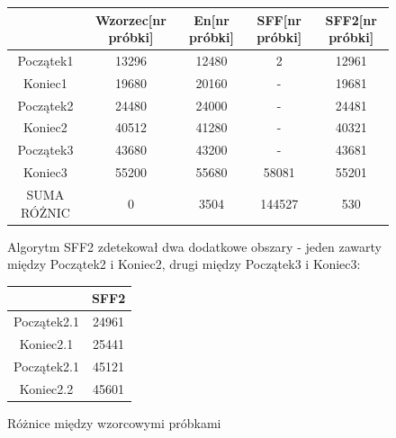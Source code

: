 \documentclass[eng,printmode]{mgr}
\begin{document}
	 \begin{figure}
	 	\begin{center}
	 		\begin{tabular}{||c c c c c||} 
	 			\hline
	 			&Wzorzec[nr próbki] & En[nr próbki] & SFF[nr próbki] & SFF2[nr próbki] \\ [0.5ex] 
	 			\hline
	 			Początek1 & 13296 & 12480 & 2 & 12961 \\ 
	 			\hline
	 			Koniec1 & 19680 & 20160 & - & 19681 \\ 
	 			\hline
	 			Początek2 & 24480 & 24000 & - & 24481 \\ 
	 			\hline
	 			Koniec2 & 40512 & 41280 & - & 40321 \\
	 			\hline
	 			Początek3 & 43680 & 43200 & - & 43681\\
	 			\hline
	 			Koniec3 & 55200 & 55680 & 58081 & 55201\\
	 			\hline
	 			SUMA RÓŻNIC & 0 & 3504 & 144527 & 530\\
	 			\hline
	 		\end{tabular}
	 		\caption{Różnice między wzorcowymi próbkami}
	 	\end{center}
	 	
	 	Algorytm SFF2 zdetekował dwa dodatkowe obszary - jeden zawarty między Początek2 i Koniec2, drugi między Początek3 i Koniec3:
	 	\begin{center}
	 		\begin{tabular}{||c c||} 
	 			\hline
	 			&SFF2 \\ [0.5ex] 
	 			\hline
	 			Początek2.1 & 24961 \\ 
	 			\hline
	 			Koniec2.1 & 25441 \\ 
	 			\hline
	 			Początek2.1 & 45121\\ 
	 			\hline
	 			Koniec2.2 &45601\\
	 			\hline
	 		\end{tabular}
	 	\end{center}
	 \end{figure}
	 
	 
 
\end{document}
